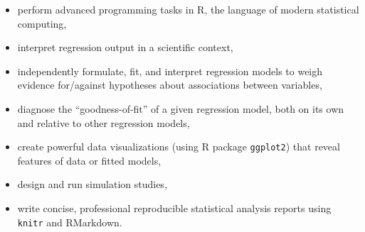 \documentclass[10pt]{article}
\begin{document}
\begin{itemize}
\item perform advanced programming tasks in R, the language of modern statistical computing,
\item interpret regression output in a scientific context,
\item independently formulate, fit, and interpret regression models to weigh evidence for/against hypotheses about associations between variables, 
\item diagnose the ``goodness-of-fit'' of a given regression model, both on its own and relative to other regression models,
\item create powerful data visualizations (using R package {\tt ggplot2}) that reveal features of data or fitted models,
\item design and run simulation studies, 
\item write concise, professional reproducible statistical analysis reports using {\tt knitr} and RMarkdown.
\end{itemize}
    
 \clearpage
{} 

 
\end{document}
